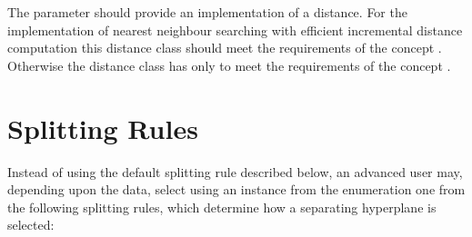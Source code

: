 The parameter  should provide an implementation of a distance.
For the implementation of nearest neighbour searching with efficient incremental
distance computation this distance class should meet the requirements of the concept
. Otherwise the distance class has only to meet the
requirements of the concept .


\section{Splitting Rules}

Instead of using the default splitting rule  described below,
an advanced user may, depending upon the data, select 
using an instance from the enumeration 
one from the following splitting rules,
which determine how a separating hyperplane is selected:

